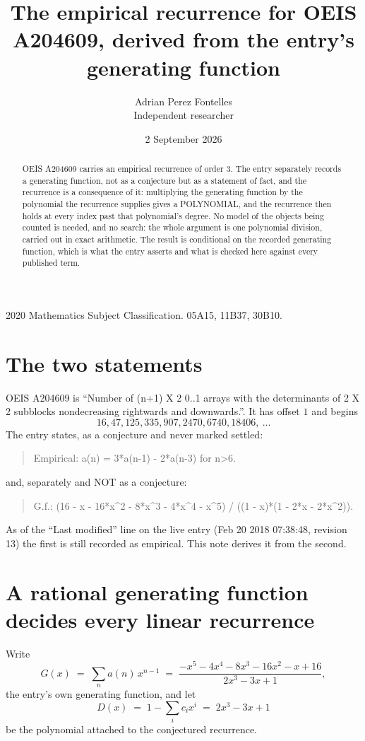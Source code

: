 \documentclass[11pt,a4paper]{article}
\title{The empirical recurrence for OEIS A204609, derived from the entry's generating function}
\author{Adrian Perez Fontelles\\ \small Independent researcher}
\date{2 September 2026}
\theoremstyle{plain}
\theoremstyle{definition}
\begin{document}
\maketitle

\begin{abstract}
OEIS A204609 carries an empirical recurrence of order $3$. The entry separately records a
generating function, not as a conjecture but as a statement of fact, and the recurrence is a
consequence of it: multiplying the generating function by the polynomial the recurrence
supplies gives a POLYNOMIAL, and the recurrence then holds at every index past that
polynomial's degree. No model of the objects being counted is needed, and no search: the
whole argument is one polynomial division, carried out in exact arithmetic. The result is
conditional on the recorded generating function, which is what the entry asserts and what is
checked here against every published term.
\end{abstract}

\noindent\small 2020 Mathematics Subject Classification. 05A15, 11B37, 30B10.\normalsize

\section{The two statements}

OEIS A204609 is ``Number of (n+1) X 2 0..1 arrays with the determinants of 2 X 2 subblocks nondecreasing rightwards and downwards.''. It has offset $1$ and begins
\[
16, 47, 125, 335, 907, 2470, 6740, 18406,\ \dots
\]
The entry states, as a conjecture and never marked settled:
\begin{quote}
Empirical: a(n) = 3*a(n-1) - 2*a(n-3) for n>6.
\end{quote}
and, separately and NOT as a conjecture:
\begin{quote}
G.f.: (16 - x - 16*x\^{}2 - 8*x\^{}3 - 4*x\^{}4 - x\^{}5) / ((1 - x)*(1 - 2*x - 2*x\^{}2)).
\end{quote}
As of the ``Last modified'' line on the live entry (Feb 20 2018 07:38:48, revision 13) the first is still
recorded as empirical. This note derives it from the second.

\section{A rational generating function decides every linear recurrence}

Write
\[
G(x)\;=\;\sum_{n}a(n)\,x^{n-1}\;=\;\frac{- x^{5} - 4 x^{4} - 8 x^{3} - 16 x^{2} - x + 16}{2 x^{3} - 3 x + 1},
\]
the entry's own generating function, and let
\[
D(x)\;=\;1-\sum_i c_i x^{i}\;=\;2 x^{3} - 3 x + 1
\]
be the polynomial attached to the conjectured recurrence.
\end{document}
